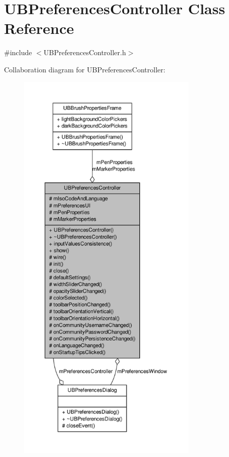 \hypertarget{class_u_b_preferences_controller}{\section{U\-B\-Preferences\-Controller Class Reference}
\label{d3/d33/class_u_b_preferences_controller}
}


{\ttfamily \#include $<$U\-B\-Preferences\-Controller.\-h$>$}



Collaboration diagram for U\-B\-Preferences\-Controller\-:
\nopagebreak
\begin{figure}[H]
\begin{center}
\leavevmode
\includegraphics[height=550pt]{d5/da6/class_u_b_preferences_controller__coll__graph}
\end{center}
\end{figure}
